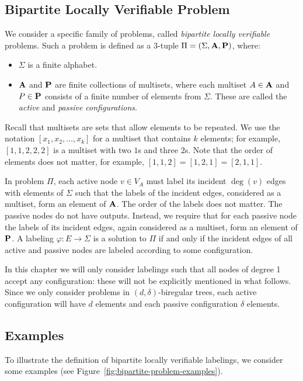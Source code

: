 \subsection{Bipartite Locally Verifiable Problem}

We consider a specific family of problems, called \emph{bipartite locally verifiable} problems. Such a problem is defined as a 3-tuple $\Pi = (\Sigma, \mathbf{A}, \mathbf{P})$, where:
\begin{itemize}
	\item $\Sigma$ is a finite alphabet.
	\item $\mathbf{A}$ and $\mathbf{P}$ are finite collections of multisets, where each multiset $A \in \mathbf{A}$ and $P \in \mathbf{P}$ consists of a finite number of elements from $\Sigma$. These are called the \emph{active} and \emph{passive configurations}. 
\end{itemize}
Recall that multisets are sets that allow elements to be repeated. We use the notation $[x_1, x_2, \dotsc, x_k]$ for a multiset that contains $k$ elements; for example, $[1,1,2,2,2]$ is a multiset with two $1$s and three $2$s. Note that the order of elements does not matter, for example, $[1,1,2] = [1,2,1] = [2,1,1]$.

In problem $\Pi$, each active node $v \in V_A$ must label its incident $\deg(v)$ edges with elements of $\Sigma$ such that the labels of the incident edges, considered as a multiset, form an element of $\mathbf{A}$. The order of the labels does not matter. The passive nodes do not have outputs. Instead, we require that for each passive node the labels of its incident edges, again considered as a multiset, form an element of $\mathbf{P}$. A labeling $\varphi\colon E \to \Sigma$ is a solution to $\Pi$ if and only if the incident edges of all active and passive nodes are labeled according to some configuration.

In this chapter we will only consider labelings such that all nodes of degree 1 accept any configuration: these will not be explicitly mentioned in what follows. Since we only consider problems in $(d,\delta)$-biregular trees, each active configuration will have $d$ elements and each passive configuration $\delta$ elements.

\subsection{Examples} \label{ssec:bipartite-examples}

To illustrate the definition of bipartite locally verifiable labelings, we consider some examples (see Figure~\ref{fig:bipartite-problem-examples}).

